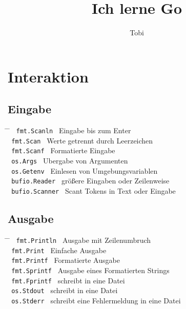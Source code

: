 \documentclass[twoside,a4paper,12pt]{article}
\title{Ich lerne Go}
\author{Tobi}
\begin{document}
\maketitle
\thispagestyle{empty} %
\newpage

\tableofcontents
\newpage

\section{Interaktion}
\subsection{Eingabe}
\begin{tabbing}
  \hspace{2mm} \= \hspace{70mm} \= \kill
  \> \verb| fmt.Scanln | \> Eingabe bis zum Enter \\  
  \> \verb| fmt.Scan | \> Werte getrennt durch Leerzeichen \\ 
  \> \verb| fmt.Scanf | \> Formatierte Eingabe \\ 
  \> \verb| os.Args | \> Ubergabe von Argumenten \\ 
  \> \verb| os.Getenv | \> Einlesen von Umgebungsvariablen \\
  \> \verb| bufio.Reader | \> größere Eingaben oder Zeilenweise \\ 
  \> \verb| bufio.Scanner | \>  Scant Tokens in Text oder Eingabe \\
\end{tabbing}
\subsection{Ausgabe}
\begin{tabbing}
  \hspace{2mm} \= \hspace{70mm} \= \kill
  \> \verb| fmt.Println | \> Ausgabe mit Zeilenumbruch \\ 
  \> \verb| fmt.Print | \> Einfache Ausgabe \\ 
  \> \verb| fmt.Printf | \> Formatierte Ausgabe \\ 
  \> \verb| fmt.Sprintf | \> Ausgabe eines Formatierten Strings \\ 
  \> \verb| fmt.Fprintf | \> schreibt in eine Datei \\ 
  \> \verb| os.Stdout | \> schreibt in eine Datei \\ 
  \> \verb| os.Stderr | \> schreibt eine Fehlermeldung in eine Datei \\ 
\end{tabbing}
\end{document}

